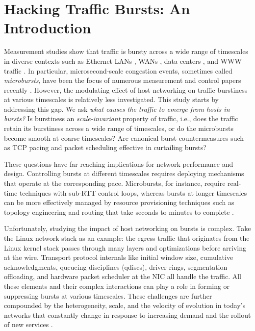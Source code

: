 \chapter{Hacking Traffic Bursts: An Introduction} \label{chap:chap-1}


Measurement studies show that traffic is bursty across a wide range of timescales in diverse contexts such as Ethernet LANs \cite{selfsim}, WANs \cite{wan}, data centers \cite{fbIMC22}, and WWW traffic \cite{web}.
In particular, microsecond-scale congestion events, sometimes called \emph{microbursts}, have been the focus of numerous measurement and control papers recently \cite{swift, conquest, snappy, radar, high-resolution, wild, fbIMC22,incast}. However, the modulating effect of host networking on traffic burstiness at various timescales is relatively less investigated. This study starts by addressing this gap.
We ask \emph{what causes the traffic to emerge from hosts in bursts?} Is burstiness an \emph{scale-invariant} property of traffic, i.e., does the traffic retain its burstiness across a wide range of timescales, or do the microbursts become smooth at coarse timescales? Are canonical burst countermeasures such as TCP pacing and packet scheduling effective in curtailing bursts?

These questions have far-reaching implications for network performance and design. Controlling bursts at different timescales requires deploying mechanisms that operate at the corresponding pace. Microbursts, for instance, require real-time techniques with sub-RTT control loops, whereas bursts at longer timescales can be more effectively managed by resource provisioning techniques such as topology engineering and routing that take seconds to minutes to complete \cite{gemini}.

Unfortunately, studying the impact of host networking on bursts is complex. Take the Linux network stack as an example: the egress traffic that originates from the Linux kernel stack passes through many layers and optimizations before arriving at the wire. Transport protocol internals like initial window size, cumulative acknowledgments, queueing disciplines (qdiscs), driver rings, segmentation offloading, and hardware packet scheduler at the NIC all handle the traffic.
All these elements and their complex interactions can play a role in forming or suppressing bursts at various timescales. 
%
These challenges are further compounded by the heterogeneity, scale, and 
the velocity of evolution in today's networks that constantly change in response to increasing demand and the rollout of new services \cite{snap, evolvable, govindan2016evolve}. 

